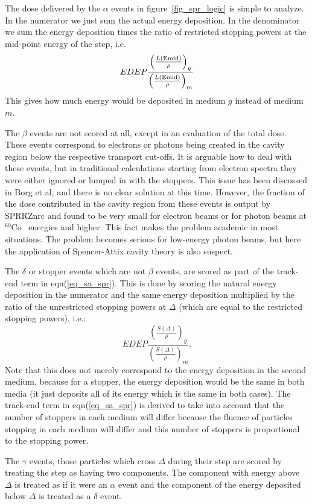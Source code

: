 \documentclass[12pt,twoside]{article}  %
\newcommand{\Co}{$^{60}$Co}
\newcommand{\eqn}[1]{\begin{equation} #1 \end{equation} }
\newcommand{\rspt}[1]{\left( \frac{S(\Delta)}{\rho} \right)_{#1}}
\newcommand{\rspE}[2]{\left( \frac{L({\rm #1})}{\rho} \right)_{#2}}
\begin{document}
The dose delivered by the $\alpha$ events in figure~\ref{fig_spr_logic}
is simple to analyze. In the numerator we just sum the actual energy
deposition. In the denominator we sum the energy deposition times
the ratio of restricted stopping powers at the mid-point energy of the
step, i.e.
\eqn{EDEP \frac{\rspE{Emid}{g}}{\rspE{Emid}{m}}}
This gives how much energy would be deposited in medium $g$ instead of
medium $m$.

The $\beta$ events are not scored at all, except in an evaluation of the
total dose. These events correspond to electrons or photons being created
in the cavity region below the respective transport cut-offs. It is
arguable how to deal with these events, but in traditional calculations
starting from electron spectra they were either ignored or lumped in with
the stoppers.  This issue has been discussed in Borg et al, and there is no
clear solution at this time\cite{Bo99a}.  However, the fraction of the dose contributed
in the cavity region from these events is output by SPRRZnrc and found to
be very small for electron beams or for photon beams at \Co~ energies and
higher. This fact makes the problem academic in most situations.  The
problem becomes serious for low-energy photon beams, but here the
application of Spencer-Attix cavity theory is also suspect\cite{Bo99a}.

The $\delta$ or stopper events which are not $\beta$ events,
are scored as part of the track-end term in
eqn(\ref{eq_sa_spr}).  This is done by scoring the natural energy deposition
in the numerator and the same energy deposition multiplied by the ratio of
the unrestricted stopping powers at $\Delta$ (which are equal to the
restricted stopping powers), i.e.:
\eqn{EDEP \frac{\rspt{g}}{\rspt{m}}.}
Note that this does not merely correspond to the energy deposition in the
second medium, because for a stopper, the energy deposition would be the
same in both media (it just deposits all of its energy which is the same in
both cases). The track-end term in eqn(\ref{eq_sa_spr}) is derived to take
into account that the number of stoppers in each medium will differ because
the fluence of particles stopping in each medium will differ and this
number of stoppers is proportional to the stopping power.

The $\gamma$ events, those particles which cross $\Delta$ during their step
are scored by treating the step as having two components.  The component
with energy above $\Delta$ is treated as if it were an $\alpha$ event and
the component of the energy deposited below $\Delta$ is treated as a
$\delta$ event.
\end{document}
